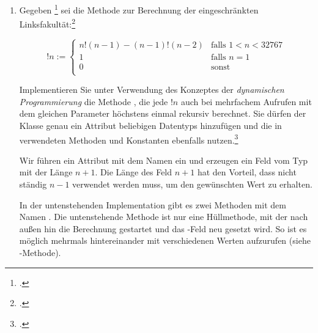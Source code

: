 \documentclass{bschlangaul-aufgabe}
\begin{document}
\begin{enumerate}


\item Gegeben
\footcite[Seite 2-3]{examen:66115:2014:03} sei die Methode
 zur Berechnung der eingeschränkten
Linksfakultät:\footcite[Seite 25]{aud:fs:1}

\begin{equation*}
!n :=
\begin{cases}
n !(n - 1) - (n - 1) !(n - 2) &
\text{falls } 1 < n < 32767 \\

1 &
\text{falls } n = 1 \\

0 &
\text{sonst } \\
\end{cases}
\end{equation*}


Implementieren Sie unter Verwendung des Konzeptes der \emph{dynamischen
Programmierung} die Methode , die
jede $!n$ auch bei mehrfachem Aufrufen mit dem gleichen Parameter
höchstens einmal rekursiv berechnet. Sie dürfen der Klasse
 genau ein Attribut beliebigen Datentyps
hinzufügen und die in  verwendeten Methoden und
Konstanten ebenfalls nutzen.\footcite[Aufgabe 5]{aud:pu:1}

\begin{bAntwort}
Wir führen ein Attribut mit dem Namen  ein und
erzeugen ein Feld vom Typ  mit der Länge $n + 1$.
Die Länge des Feld $n + 1$ hat den Vorteil, dass nicht ständig $n - 1$
verwendet werden muss, um den gewünschten Wert zu erhalten.

In der untenstehenden Implementation gibt es zwei Methoden mit dem Namen
. Die untenstehende Methode ist nur eine Hüllmethode, mit
der nach außen hin die Berechnung gestartet und das
-Feld neu gesetzt wird. So ist es möglich
 mehrmals hintereinander mit verschiedenen Werten
aufzurufen (siehe -Methode).

\end{bAntwort}


\end{enumerate}
\end{document}
